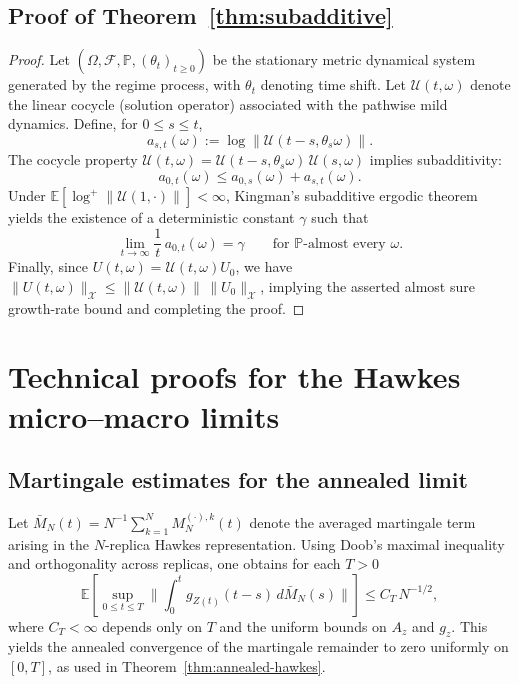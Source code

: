 \documentclass[12pt,a4paper]{article}
\theoremstyle{plain}
\theoremstyle{definition}
\theoremstyle{remark}
\begin{document}
	\subsection*{Proof of Theorem~\ref{thm:subadditive}}
	\label{app:proof-subadditive}
	\begin{proof}[Proof]%
		Let $(\Omega,\mathcal F,\mathbb P,(\theta_t)_{t\ge0})$ be the stationary metric dynamical system
		generated by the regime process, with $\theta_t$ denoting time shift.
		Let $\mathcal U(t,\omega)$ denote the linear cocycle (solution operator) associated with the
		pathwise mild dynamics.
		Define, for $0\le s\le t$,
		\[
		a_{s,t}(\omega):=\log\|\mathcal U(t-s,\theta_s\omega)\|.
		\]
		The cocycle property $\mathcal U(t,\omega)=\mathcal U(t-s,\theta_s\omega)\,\mathcal U(s,\omega)$ implies
		subadditivity:
		\[
		a_{0,t}(\omega)\le a_{0,s}(\omega)+a_{s,t}(\omega).
		\]
		Under $\mathbb E[\log^+\|\mathcal U(1,\cdot)\|]<\infty$, Kingman's subadditive ergodic theorem yields the
		existence of a deterministic constant $\gamma$ such that
		\[
		\lim_{t\to\infty}\frac{1}{t}\,a_{0,t}(\omega)=\gamma
		\qquad \text{for $\mathbb P$-almost every }\omega.
		\]
		Finally, since $U(t,\omega)=\mathcal U(t,\omega)U_0$, we have
		$\|U(t,\omega)\|_{\mathcal X}\le \|\mathcal U(t,\omega)\|\,\|U_0\|_{\mathcal X}$, implying the asserted
		almost sure growth-rate bound and completing the proof.
	\end{proof}
	
	
	\section{Technical proofs for the Hawkes micro--macro limits}
	\label{app:hawkes}
	
	\subsection{Martingale estimates for the annealed limit}
	Let $\bar M_N(t)=N^{-1}\sum_{k=1}^N M_N^{(\cdot),k}(t)$ denote the averaged martingale term
	arising in the $N$-replica Hawkes representation.
	Using Doob's maximal inequality and orthogonality across replicas, one obtains for each $T>0$
	\[
	\mathbb E\!\left[
	\sup_{0\le t\le T}
	\Big\|
	\int_0^t g_{Z(t)}(t-s)\,d\bar M_N(s)
	\Big\|
	\right]
	\le
	C_T\,N^{-1/2},
	\]
	where $C_T<\infty$ depends only on $T$ and the uniform bounds on $A_z$ and $g_z$.
	This yields the annealed convergence of the martingale remainder to zero uniformly on $[0,T]$,
	as used in Theorem~\ref{thm:annealed-hawkes}.
	
\end{document}
